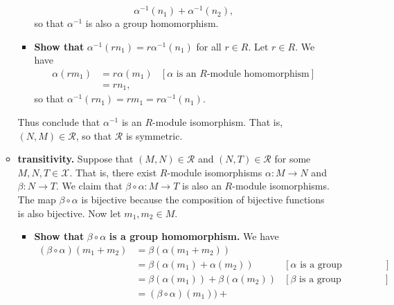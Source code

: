 \documentclass[9pt]{article}
\begin{document}
\begin{enumerate}
\begin{itemize}
\begin{itemize}
$$                          \alpha^{-1}(n_1) + \alpha^{-1}(n_2),$$
                        so that $\alpha^{-1}$ is also a group homomorphism.
                  \item \textbf{Show that }
                        $\alpha^{-1}(rn_1) = r\alpha^{-1}(n_1)$ for all
                        $r \in R$. Let $r \in R$. We have
                        \begin{align*}
                           \alpha(rm_1) &= r\alpha(m_1) 
                              &[\alpha \text{ is an }R
                                \text{-module homomorphism}] \\
                              &= rn_1,
                        \end{align*}
                        so that $\alpha^{-1}(rn_1) = rm_1 = r\alpha^{-1}(n_1)$.
               \end{itemize}
               Thus conclude that $\alpha^{-1}$ is an $R$-module isomorphism.
               That is, $(N, M) \in \mathcal{R}$, so that $\mathcal{R}$ is
               symmetric.
         \item \textbf{transitivity.} Suppose that $(M, N) \in \mathcal{R}$ and
               $(N, T) \in \mathcal{R}$ for some $M, N, T \in \mathscr{X}$.
               That is, there exist $R$-module isomorphisms
               $\alpha : M \rightarrow N$ and $\beta : N \rightarrow T$. We
               claim that $\beta\circ\alpha : M \rightarrow T$ is also an
               $R$-module isomorphisms. The map $\beta\circ\alpha$ is bijective
               because the composition of bijective functions is also bijective.
               Now let $m_1, m_2 \in M$.
               \begin{itemize}
                  \item \textbf{Show that } $\beta\circ\alpha$
                        \textbf{is a group homomorphism.} We have
                        \begin{align*}
                           (\beta\circ\alpha)(m_1 + m_2) &=
                              \beta(\alpha(m_1 + m_2)) \\
                              &= \beta(\alpha(m_1) + \alpha(m_2))
                                 &[\alpha \text{ is a group homomorphism}] \\
                              &= \beta(\alpha(m_1)) + \beta(\alpha(m_2))
                                 &[\beta \text{ is a group homomorphism}] \\
                              &= (\beta\circ\alpha)(m_1)) +

\end{align*}
\end{itemize}
\end{itemize}
\end{enumerate}
\end{document}
